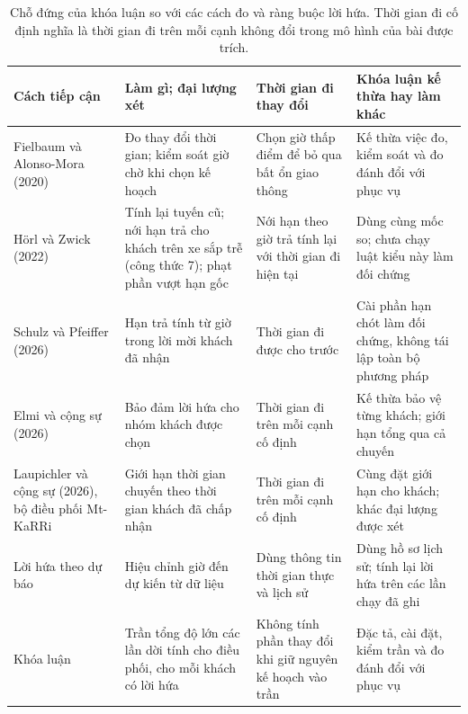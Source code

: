 \begin{table}[htbp]
\centering
\caption{Chỗ đứng của khóa luận so với các cách đo và ràng buộc lời hứa. Thời gian đi cố định nghĩa là
thời gian đi trên mỗi cạnh không đổi trong mô hình của bài được trích.}
\label{bang:c1-chodung}
\footnotesize
\begin{tabular}{@{}p{2.8cm}p{4.0cm}p{3.3cm}p{4.5cm}@{}}
\toprule
\textbf{Cách tiếp cận} & \textbf{Làm gì; đại lượng xét} &
\textbf{Thời gian đi thay đổi} & \textbf{Khóa luận kế thừa hay làm khác}\\
\midrule
Fielbaum và Alonso-Mora (2020)~\cite{fielbaum2020}
& Đo thay đổi thời gian; kiểm soát giờ chờ khi chọn kế hoạch
& Chọn giờ thấp điểm để bỏ qua bất ổn giao thông
& Kế thừa việc đo, kiểm soát và đo đánh đổi với phục vụ\\
Hörl và Zwick (2022)~\cite{horl2022}
& Tính lại tuyến cũ; nới hạn trả cho khách trên xe sắp trễ (công thức 7); phạt phần vượt hạn gốc
& Nới hạn theo giờ trả tính lại với thời gian đi hiện tại
& Dùng cùng mốc so; chưa chạy luật kiểu này làm đối chứng\\
Schulz và Pfeiffer (2026)~\cite{schulz2026}
& Hạn trả tính từ giờ trong lời mời khách đã nhận
& Thời gian đi được cho trước
& Cài phần hạn chót làm đối chứng, không tái lập toàn bộ phương pháp\\
Elmi và cộng sự (2026)~\cite{elmi2026}
& Bảo đảm lời hứa cho nhóm khách được chọn
& Thời gian đi trên mỗi cạnh cố định
& Kế thừa bảo vệ từng khách; giới hạn tổng qua cả chuyến\\
Laupichler và cộng sự (2026), bộ điều phối Mt-KaRRi~\cite{laupichler2026}
& Giới hạn thời gian chuyến theo thời gian khách đã chấp nhận
& Thời gian đi trên mỗi cạnh cố định
& Cùng đặt giới hạn cho khách; khác đại lượng được xét\\
Lời hứa theo dự báo~\cite{hu2022}
& Hiệu chỉnh giờ đến dự kiến từ dữ liệu
& Dùng thông tin thời gian thực và lịch sử
& Dùng hồ sơ lịch sử; tính lại lời hứa trên các lần chạy đã ghi\\
Khóa luận
& Trần tổng độ lớn các lần dời tính cho điều phối, cho mỗi khách có lời hứa
& Không tính phần thay đổi khi giữ nguyên kế hoạch vào trần
& Đặc tả, cài đặt, kiểm trần và đo đánh đổi với phục vụ\\
\bottomrule
\end{tabular}
\end{table}


